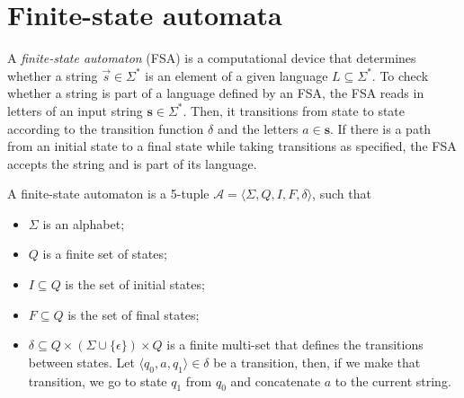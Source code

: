 \section{Finite-state automata} \label{sec:fsa}



A \textit{finite-state automaton} (FSA) is a computational device that
determines whether a string $\vec{s}\in\Sigma^*$ is an element of a given
language $L\subseteq\Sigma^*$. To check whether a string is part of a language
defined by an FSA, the FSA reads in letters of an input string
$\bm{s}\in\Sigma^*$. Then, it transitions from state to state according to the
transition function $\delta$ and the letters $a\in\bm{s}$. If there is a path
from an initial state to a final state while taking transitions as specified,
the FSA accepts the string and is part of its language.


\begin{definition}
    A finite-state automaton is a 5-tuple $\mathcal{A}=\langle \Sigma, Q, I, F,
        \delta \rangle$, such that
    \begin{itemize}
        \item $\Sigma$ is an alphabet;
        \item $Q$ is a finite set of states;
        \item $I\subseteq Q$ is the set of initial states;
        \item $F\subseteq Q$ is the set of final states;
        \item $\delta\subseteq Q \times (\Sigma\cup\{\epsilon\}) \times Q$ is a
              finite multi-set that defines the transitions between states. Let
              $\langle q_0,a,q_1 \rangle\in\delta$ be a transition, then, if we make
              that transition, we go to state $q_1$ from $q_0$ and concatenate $a$ to
              the current string.
    \end{itemize}
\end{definition}

